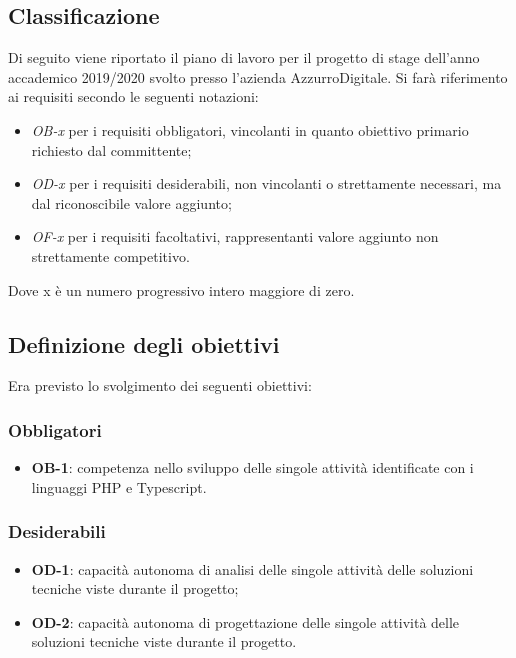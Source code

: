 \subsection{Classificazione}
Di seguito viene riportato il piano di lavoro per il progetto di stage dell'anno accademico 2019/2020 svolto presso l'azienda AzzurroDigitale.
Si farà riferimento ai requisiti secondo le seguenti notazioni:
\begin{itemize}
	\item \textit{OB-x} per i requisiti obbligatori, vincolanti in quanto obiettivo primario richiesto dal committente;
	\item \textit{OD-x} per i requisiti desiderabili, non vincolanti o strettamente necessari,
	ma dal riconoscibile valore aggiunto;
	\item \textit{OF-x} per i requisiti facoltativi, rappresentanti valore aggiunto non strettamente competitivo.
\end{itemize}
Dove x è un numero progressivo intero maggiore di zero.

\subsection{Definizione degli obiettivi}
\label{cap:obbiettivi}
Era previsto lo svolgimento dei seguenti obiettivi:
\subsubsection*{Obbligatori}
\begin{itemize}
 \item \textbf{OB-1}: competenza nello sviluppo delle singole attività identificate con i linguaggi \gls{PHP} e Typescript.
\end{itemize}
\subsubsection*{Desiderabili} 
\begin{itemize}
 \item \textbf{OD-1}: capacità autonoma di analisi delle singole attività delle soluzioni tecniche viste durante il progetto;
\item \textbf{OD-2}: capacità autonoma di progettazione delle singole attività delle soluzioni tecniche viste durante il progetto.
\end{itemize}

